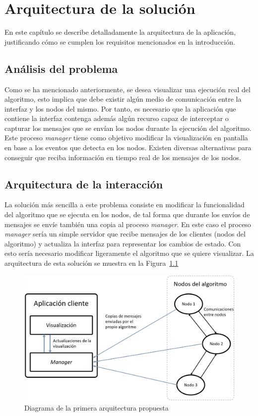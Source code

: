 \chapter{Arquitectura de la solución}

En este capítulo se describe detalladamente la arquitectura de la aplicación, justificando cómo se cumplen los requisitos mencionados en la introducción.

\section{Análisis del problema}

Como se ha mencionado anteriormente, se desea visualizar una ejecución real del algoritmo, esto implica que debe existir algún medio de comunicación entre la interfaz y los nodos del mismo. Por tanto, es necesario que la aplicación que contiene la interfaz contenga además algún recurso capaz de interceptar o capturar los mensajes que se envían los nodos durante la ejecución del algoritmo. Este proceso \textit{manager} tiene como objetivo modificar la visualización en pantalla en base a los eventos que detecta en los nodos. Existen diversas alternativas para conseguir que reciba información en tiempo real de los mensajes de los nodos.

\section{Arquitectura de la interacción}
\label{sec:arquitectura}

La solución más sencilla a este problema consiste en modificar la funcionalidad del algoritmo que se ejecuta en los nodos, de tal forma que durante los envíos de mensajes se envíe también una copia al proceso \textit{manager}. En este caso el proceso \textit{manager} sería un simple servidor que recibe mensajes de los clientes (nodos del algoritmo) y actualiza la interfaz para representar los cambios de estado. Con esto sería necesario modificar ligeramente el algoritmo que se quiere visualizar. La arquitectura de esta solución se muestra en la Figura~\ref{fig:arquitectura1}

\newpage

\begin{figure}[h]
  \centering
  \includegraphics[width=0.7\linewidth]{imagenes/arquitectura1}
  \caption{Diagrama de la primera arquitectura propuesta}
  \label{fig:arquitectura1}
\end{figure}

